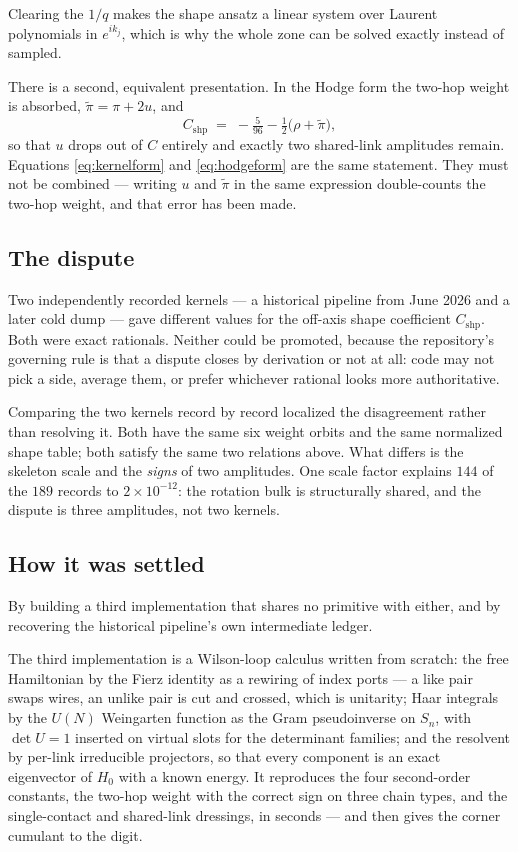Clearing the $1/q$ makes the shape ansatz a linear system over Laurent
polynomials in $e^{ik_j}$, which is why the whole zone can be solved
exactly instead of sampled.

There is a second, equivalent presentation. In the Hodge form the
two-hop weight is absorbed, $\tilde\pi = \pi + 2u$, and
\begin{equation}
  C_{\mathrm{shp}} \;=\; -\tfrac{5}{96} - \tfrac12\big(\rho + \tilde\pi\big),
  \label{eq:hodgeform}
\end{equation}
so that $u$ drops out of $C$ entirely and exactly two shared-link
amplitudes remain. Equations \eqref{eq:kernelform} and
\eqref{eq:hodgeform} are the same statement. They must not be
combined --- writing $u$ and $\tilde\pi$ in the same expression
double-counts the two-hop weight, and that error has been made.

\subsection{The dispute}

Two independently recorded kernels --- a historical pipeline from June
2026 and a later cold dump --- gave different values for the off-axis
shape coefficient $C_{\mathrm{shp}}$. Both were exact rationals. Neither
could be promoted, because the repository's governing rule is that a
dispute closes by derivation or not at all: code may not pick a side,
average them, or prefer whichever rational looks more authoritative.

Comparing the two kernels record by record localized the disagreement
rather than resolving it. Both have the same six weight orbits and the
same normalized shape table; both satisfy the same two relations above.
What differs is the skeleton scale and the \emph{signs} of two
amplitudes. One scale factor explains $144$ of the $189$ records to
$2\times10^{-12}$: the rotation bulk is structurally shared, and the
dispute is three amplitudes, not two kernels.

\subsection{How it was settled}

By building a third implementation that shares no primitive with either,
and by recovering the historical pipeline's own intermediate ledger.

The third implementation is a Wilson-loop calculus written from scratch:
the free Hamiltonian by the Fierz identity as a rewiring of index ports
--- a like pair swaps wires, an unlike pair is cut and crossed, which is
unitarity; Haar integrals by the $U(N)$ Weingarten function as the Gram
pseudoinverse on $S_n$, with $\det U = 1$ inserted on virtual slots for
the determinant families; and the resolvent by per-link irreducible
projectors, so that every component is an exact eigenvector of $H_0$
with a known energy. It reproduces the four second-order constants, the
two-hop weight with the correct sign on three chain types, and the
single-contact and shared-link dressings, in seconds --- and then gives
the corner cumulant to the digit.

